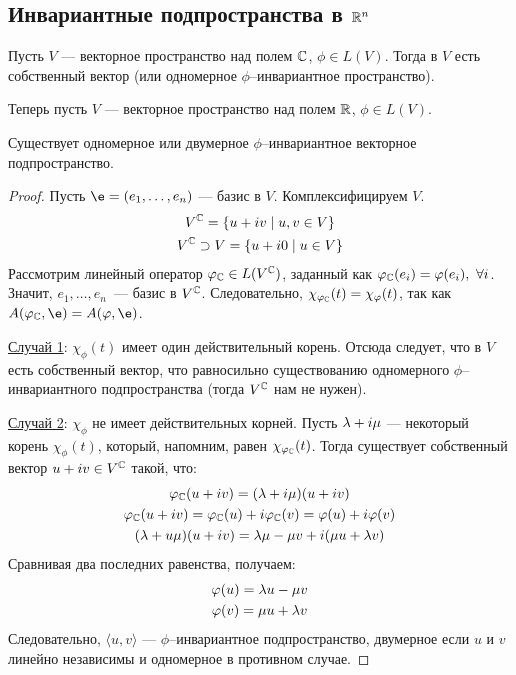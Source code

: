 \subsection*{Инвариантные подпространства в $\mathbb{R}^n$}

Пусть $V$ --- векторное пространство над полем $\mathbb{C}$, $\phi \in L(V)$. Тогда в $V$ есть собственный вектор (или одномерное $\phi$--инвариантное пространство).

\vspace{0.2cm}
Теперь пусть $V$ --- векторное пространство над полем $\mathbb{R}$, $\phi \in L(V)$.

\begin{Theorem}
Существует одномерное или двумерное $\phi$--инвариантное векторное подпространство.
\end{Theorem}

\begin{proof}
Пусть $\e = (e_1, \ldots, e_n)$ --- базис в $V$. Комплексифицируем $V$.
\begin{gather*}
V^{\mathbb{C}} = \{ u + iv \mid u, v \in V \} \\
V^{\mathbb{C}} \supset V = \{u + i0 \mid u \in V  \}
\end{gather*}
Рассмотрим линейный оператор $\varphi_{\mathbb{C}} \in L(V^{\mathbb{C}})$, заданный как $\varphi_{\mathbb{C}}(e_i) = \varphi(e_i),\ \forall i$. Значит, $e_1, \ldots, e_n$~--- базис в $V^{\mathbb{C}}$. Следовательно, $\chi_{\varphi_{\mathbb{C}}}(t) = \chi_\varphi(t)$, так как $A(\phi_\C, \e) = A(\phi, \e)$.

\underline{Случай 1}: $\chi_\phi(t)$ имеет один действительный корень. Отсюда следует, что в $V$ есть собственный вектор, что равносильно существованию одномерного $\phi$--инвариантного подпространства (тогда $V^{\mathbb{C}}$ нам не нужен).

\underline{Случай 2}: $\chi_\phi$ не имеет действительных корней. Пусть $\lambda + i\mu$ --- некоторый корень $\chi_\phi(t) $, который, напомним, равен $\chi_{\varphi_{\mathbb{C}}}(t)$. Тогда существует собственный вектор $u+iv \in V^{\mathbb{C}}$ такой, что:
\begin{gather*}
\varphi_{\mathbb{C}}(u+iv) = (\lambda + i\mu)(u+iv)\\
\varphi_{\mathbb{C}}(u + iv) = \varphi_{\mathbb{C}}(u) + i\varphi_{\mathbb{C}}(v) = \varphi(u) + i\varphi(v) \\
(\lambda + u\mu)(u + iv) = \lambda \mu - \mu v + i(\mu u + \lambda v)
\end{gather*}
Сравнивая два последних равенства, получаем:
\begin{gather*}
\varphi(u) =  \lambda u - \mu v \\
\varphi(v) = \mu u + \lambda v
\end{gather*}
Следовательно, $\langle u, v \rangle$ --- $\phi$--инвариантное подпространство, двумерное если $u$ и $v$ линейно независимы и одномерное в противном случае.
\end{proof}

